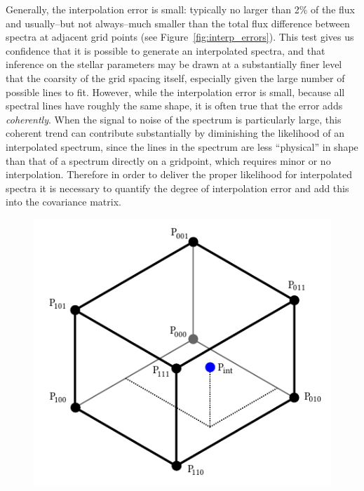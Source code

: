 \documentclass[iop,floatfix]{emulateapj}
\begin{document}
Generally, the interpolation error is small: typically no larger than 2\% of the flux and usually--but not always--much smaller than the total flux difference between spectra at adjacent grid points (see Figure~\ref{fig:interp_errors}). This test gives us confidence that it is possible to generate an interpolated spectra, and that inference on the stellar parameters may be drawn at a substantially finer level that the coarsity of the grid spacing itself, especially given the large number of possible lines to fit. However, while the interpolation error is small, because all spectral lines have roughly the same shape, it is often true that the error adds \emph{coherently}. When the signal to noise of the spectrum is particularly large, this coherent trend can contribute substantially by diminishing the likelihood of an interpolated spectrum, since the lines in the spectrum are less ``physical'' in shape than that of a spectrum directly on a gridpoint, which requires minor or no interpolation. Therefore in order to deliver the proper likelihood for interpolated spectra it is necessary to quantify the degree of interpolation error and add this into the covariance matrix. 

\begin{figure}[!t]
\begin{center}
  \includegraphics{figs/interp_grid.pdf}
  \label{fig:interp_grid}
\end{center}
\end{figure}
\end{document}
